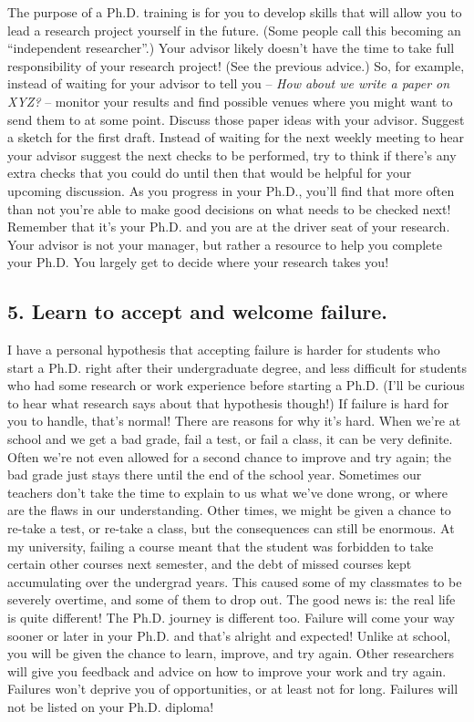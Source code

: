 \documentclass[10pt,twocolumn]{article}
\begin{document}
The purpose of a Ph.D. training is for you to develop skills that will allow you to lead a research project yourself in the future. (Some people call this becoming an “independent researcher”.)
Your advisor likely doesn’t have the time to take full responsibility of your research project! (See the previous advice.)
So, for example, instead of waiting for your advisor to tell you – \textit{How about we write a paper on XYZ?} – monitor your results and find possible venues where you might want to send them to at some point. Discuss those paper ideas with your advisor. Suggest a sketch for the first draft. Instead of waiting for the next weekly meeting to hear your advisor suggest the next checks to be performed, try to think if there’s any extra checks that you could do until then that would be helpful for your upcoming discussion. As you progress in your Ph.D., you’ll find that more often than not you’re able to make good decisions on what needs to be checked next! Remember that it’s your Ph.D. and you are at the driver seat of your research. Your advisor is not your manager, but rather a resource to help you complete your Ph.D. You largely get to decide where your research takes you!

\subsection*{5. Learn to accept and welcome failure.}

I have a personal hypothesis that accepting failure is harder for students who start a Ph.D. right after their undergraduate degree, and less difficult for students who had some research or work experience before starting a Ph.D. (I’ll be curious to hear what research says about that hypothesis though!) If failure is hard for you to handle, that’s normal! There are reasons for why it’s hard. When we’re at school and we get a bad grade, fail a test, or fail a class, it can be very definite. Often we’re not even allowed for a second chance to improve and try again; the bad grade just stays there until the end of the school year. Sometimes our teachers don’t take the time to explain to us what we’ve done wrong, or where are the flaws in our understanding. Other times, we might be given a chance to re-take a test, or re-take a class, but the consequences can still be enormous. At my university, failing a course meant that the student was forbidden to take certain other courses next semester, and the debt of missed courses kept accumulating over the undergrad years. This caused some of my classmates to be severely overtime, and some of them to drop out. The good news is: the real life is quite different! The Ph.D. journey is different too. Failure will come your way sooner or later in your Ph.D. and that’s alright and expected! Unlike at school, you will be given the chance to learn, improve, and try again. Other researchers will give you feedback and advice on how to improve your work and try again. Failures won’t deprive you of opportunities, or at least not for long. Failures will not be listed on your Ph.D. diploma!
\end{document}

